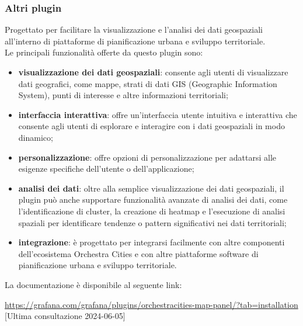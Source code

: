 \subsubsection{Altri plugin}
Progettato per facilitare la visualizzazione e l'analisi dei dati geospaziali all'interno di piattaforme di pianificazione urbana e sviluppo territoriale.\\
Le principali funzionalità offerte da questo plugin sono:
\begin{itemize}
	\item \textbf{visualizzazione dei dati geospaziali}: consente agli utenti di visualizzare dati geografici, come mappe, strati di dati GIS (Geographic Information System), punti di interesse e altre informazioni territoriali;
	\item \textbf{interfaccia interattiva}: offre un'interfaccia utente intuitiva e interattiva che consente agli utenti di esplorare e interagire con i dati geospaziali in modo dinamico;
	\item \textbf{personalizzazione}: offre opzioni di personalizzazione per adattarsi alle esigenze specifiche dell'utente o dell'applicazione;
	\item \textbf{analisi dei dati}: oltre alla semplice visualizzazione dei dati geospaziali, il plugin può anche supportare funzionalità avanzate di analisi dei dati, come l'identificazione di cluster, la creazione di heatmap e l'esecuzione di analisi spaziali per identificare tendenze o pattern significativi nei dati territoriali;
	\item \textbf{integrazione}: è progettato per integrarsi facilmente con altre componenti dell'ecosistema Orchestra Cities e con altre piattaforme software di pianificazione urbana e sviluppo territoriale.
\end{itemize}

La documentazione è disponibile al seguente link:
\begin{center}
	\url{https://grafana.com/grafana/plugins/orchestracities-map-panel/?tab=installation} [Ultima consultazione 2024-06-05]
\end{center}


